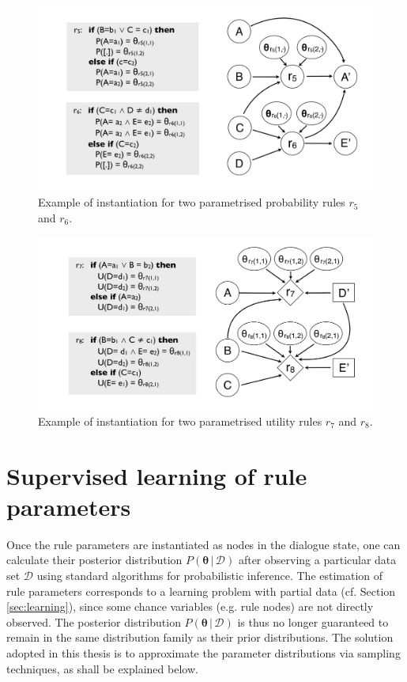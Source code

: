 \begin{figure}[h!]
\centering
\includegraphics[scale=0.25]{imgs/ruleinstantiation_params.pdf}
\caption{Example of instantiation for two parametrised probability rules $r_5$ and $r_6$.}
\label{fig:ruleinstantiation_params}
\end{figure}


\begin{figure}[h!]
\centering
\includegraphics[scale=0.25]{imgs/ruleinstantiation2_params.pdf}
\caption{Example of instantiation for two parametrised utility rules $r_7$ and $r_8$.}
\label{fig:ruleinstantiation_params2}
\end{figure}


\section{Supervised learning of rule parameters}
\label{sec:rule-supervised}

Once the rule parameters are instantiated as nodes in the dialogue state, one can calculate their posterior distribution $P(\boldsymbol\theta \, | \, \mathcal{D})$ after observing a particular data set $\mathcal{D}$ using standard algorithms for probabilistic inference. The estimation of rule parameters corresponds to a learning problem with partial data (cf. Section \ref{sec:learning}), since some chance variables (e.g. rule nodes) are not directly observed. The posterior distribution $P(\boldsymbol\theta \, | \, \mathcal{D})$ is thus no longer guaranteed to remain in the same distribution family as their prior distributions.  The solution adopted in this thesis is to approximate the parameter distributions via sampling techniques, as shall be explained below. 

